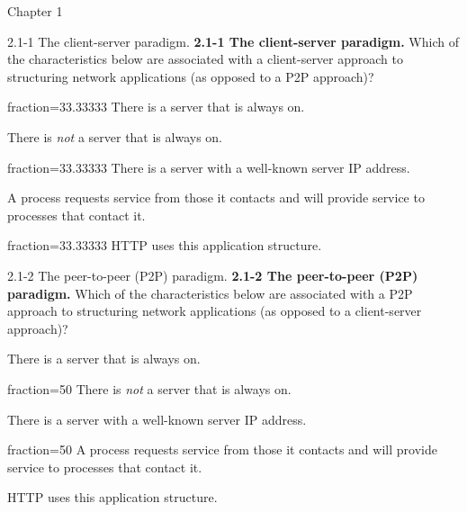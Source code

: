\documentclass[a4paper]{article}
\begin{document}
\begin{quiz}{Chapter 1}

\begin{multi}[points=1,shuffle,multiple,]{2.1-1 The client-server paradigm.}
\textbf{2.1-1 The client-server paradigm.} Which of the characteristics below are associated with a client-server approach to structuring network applications (as opposed to a P2P approach)?
\item[fraction=33.33333] There is a server that is always on.
\item There is \emph{not} a server that is always on.
\item[fraction=33.33333] There is a server with a well-known server IP address.
\item A process requests service from those it contacts and will provide service to processes that contact it.
\item[fraction=33.33333] HTTP uses this application structure.
\end{multi}

\begin{multi}[points=1,shuffle,multiple]{2.1-2 The peer-to-peer (P2P) paradigm.}
\textbf{2.1-2 The peer-to-peer (P2P) paradigm.} Which of the characteristics below are associated with a P2P approach to structuring network applications (as opposed to a client-server approach)?
\item There is a server that is always on.
\item[fraction=50] There is \emph{not} a server that is always on.
\item There is a server with a well-known server IP address.
\item[fraction=50] A process requests service from those it contacts and will provide service to processes that contact it.
\item HTTP uses this application structure.
\end{multi}


\end{quiz}
\end{document}
